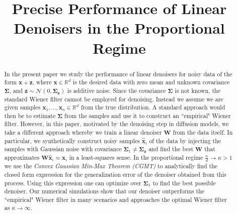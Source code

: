 \documentclass[final]{l4dc2026}
\title[Linear Denoisers]{Precise Performance of Linear Denoisers in the Proportional Regime}
\newcommand{\bSigma}{\bm{\Sigma}}
\newcommand{\bW}{\mathbf{W}}
\newcommand{\bx}{\mathbf{x}}
\newcommand{\bz}{\mathbf{z}}
\newcommand{\bbR}{\mathbb{R}}
\begin{document}
\maketitle

\makeatletter
\renewcommand\@makefntext[1]{#1}
\makeatother
\renewcommand{\thefootnote}{}
\makeatletter
\renewcommand\@makefntext[1]{\@textsuperscript{\normalfont\@thefnmark}~#1}
\makeatother
\renewcommand{\thefootnote}{\arabic{footnote}}


\begin{abstract}%

In the present paper we study the performance of linear denoisers for noisy data of the form $\bx + \bz$, where $\bx \in \bbR^d$ is the desired data with zero mean and unknown covariance $\bSigma$, and $\bz \sim \mathcal{N}(0, \bSigma_\bz)$ is additive noise. Since the covariance $\bSigma$ is not known, the standard Wiener filter cannot be employed for denoising. Instead we assume we are given samples $\bx_1,\dots,\bx_n \in \bbR^d$ from the true distribution. A standard approach would then be to estimate $\bSigma$ from the samples and use it to construct an ``empirical" Wiener filter. However, in this paper, motivated by the denoising step in diffusion models, we take a different approach whereby we train a linear denoiser $\bW$ from the data itself. In particular, we synthetically construct noisy samples $\hat{\bx}_i$ of the data by injecting the samples with Gaussian noise with covariance $\bSigma_1 \neq \bSigma_{\bz}$ and find the best $\bW$ that approximates $\bW\hat{\bx}_i \approx \bx_i$ in a least-squares sense. In the proportional regime $\frac{n}{d} \rightarrow \kappa > 1$ we use the {\it Convex Gaussian Min-Max Theorem (CGMT)} to analytically find the closed form expression for the generalization error of the denoiser obtained from this process. Using this expression one can optimize over $\bSigma_1$ to find the best possible denoiser. Our numerical simulations show that our denoiser outperforms the ``empirical" Wiener filter in many scenarios and approaches the optimal Wiener filter as $\kappa\rightarrow\infty$. 


\end{abstract}
\end{document}
